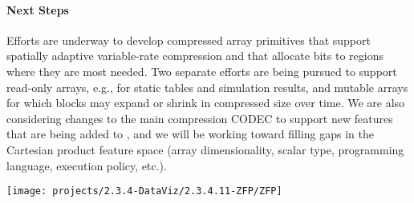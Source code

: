 \noindent
\begin{minipage}[t]{3.75in}
\paragraph{Next Steps}

Efforts are underway to develop compressed array primitives that support
spatially adaptive variable-rate compression and that allocate bits to regions
where they are most needed.
Two separate efforts are being pursued to support read-only arrays, e.g., for
static tables and simulation results, and mutable arrays for which blocks may
expand or shrink in compressed size over time.  We are also considering
changes to the main compression CODEC to support new features that are being
added to {\zfp}, and we will be working toward filling gaps in the Cartesian
product feature space (array dimensionality, scalar type, programming
language, execution policy, etc.).

\end{minipage}%
\hspace*{0.125in}%
\begin{minipage}[t]{2.625in}
\vspace{0pt}%
\texttt{[image: projects/2.3.4-DataViz/2.3.4.11-ZFP/ZFP]}%
\vspace{-2ex}%
%
\label{fig:zfp-result}%
\end{minipage}
